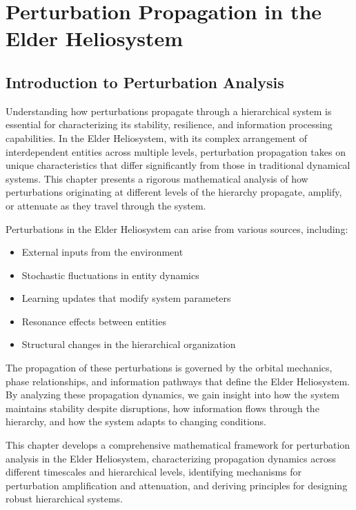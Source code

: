 \chapter{Perturbation Propagation in the Elder Heliosystem}

\section{Introduction to Perturbation Analysis}

Understanding how perturbations propagate through a hierarchical system is essential for characterizing its stability, resilience, and information processing capabilities. In the Elder Heliosystem, with its complex arrangement of interdependent entities across multiple levels, perturbation propagation takes on unique characteristics that differ significantly from those in traditional dynamical systems. This chapter presents a rigorous mathematical analysis of how perturbations originating at different levels of the hierarchy propagate, amplify, or attenuate as they travel through the system.

Perturbations in the Elder Heliosystem can arise from various sources, including:
\begin{itemize}
    \item External inputs from the environment
    \item Stochastic fluctuations in entity dynamics
    \item Learning updates that modify system parameters
    \item Resonance effects between entities
    \item Structural changes in the hierarchical organization
\end{itemize}

The propagation of these perturbations is governed by the orbital mechanics, phase relationships, and information pathways that define the Elder Heliosystem. By analyzing these propagation dynamics, we gain insight into how the system maintains stability despite disruptions, how information flows through the hierarchy, and how the system adapts to changing conditions.

This chapter develops a comprehensive mathematical framework for perturbation analysis in the Elder Heliosystem, characterizing propagation dynamics across different timescales and hierarchical levels, identifying mechanisms for perturbation amplification and attenuation, and deriving principles for designing robust hierarchical systems.

